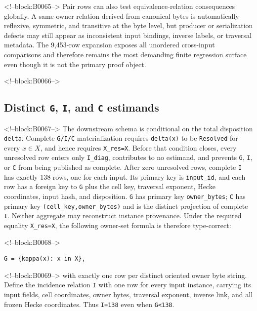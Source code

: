 \documentclass[11pt]{article}
\begin{document}
<!--block:B0065-->
Pair rows can also test equivalence-relation consequences globally. A
same-owner relation derived from canonical bytes is automatically
reflexive, symmetric, and transitive at the byte level, but producer or
serialization defects may still appear as inconsistent input bindings,
inverse labels, or traversal metadata. The 9,453-row expansion exposes
all unordered cross-input comparisons and therefore remains the most
demanding finite regression surface even though it is not the primary
proof object.

<!--block:B0066-->
\hypertarget{44-distinct-g-i-and-c-estimands}{%
\subsection{\texorpdfstring{Distinct \texttt{G}, \texttt{I}, and
\texttt{C}
estimands}{Distinct G, I, and C estimands}}\label{44-distinct-g-i-and-c-estimands}}

<!--block:B0067-->
The downstream schema is conditional on the total disposition
\texttt{delta}. Complete \texttt{G/I/C} materialization requires
\texttt{delta(x)} to be \texttt{Resolved} for every \(x\in X\), and hence
requires \texttt{X\_res=X}. Before that condition closes, every unresolved
row enters only \texttt{I\_diag}, contributes to no estimand, and prevents
\texttt{G}, \texttt{I}, or \texttt{C} from being published as complete. After
zero unresolved rows, complete \texttt{I} has exactly 138 rows, one for each
input. Its primary key is \texttt{input\_id}, and each row has a foreign key
to \texttt{G} plus the cell key, traversal exponent, Hecke coordinates, input
hash, and disposition. \texttt{G} has primary key
\texttt{owner\_bytes}; \texttt{C} has primary key
\texttt{(cell\_key,owner\_bytes)} and is the distinct projection of complete
\texttt{I}. Neither aggregate may reconstruct instance provenance. Under the
required equality \texttt{X\_res=X}, the following owner-set formula is
therefore type-correct:

<!--block:B0068-->
\begin{verbatim}
G = {kappa(x): x in X},
\end{verbatim}

<!--block:B0069-->
with exactly one row per distinct oriented owner byte string. Define the
incidence relation \texttt{I} with one row for every input instance,
carrying its input fields, cell coordinates, owner bytes, traversal
exponent, inverse link, and all frozen Hecke coordinates. Thus
\texttt{\textbar{}I\textbar{}=138} even when
\texttt{\textbar{}G\textbar{}\textless{}138}.
\end{document}
